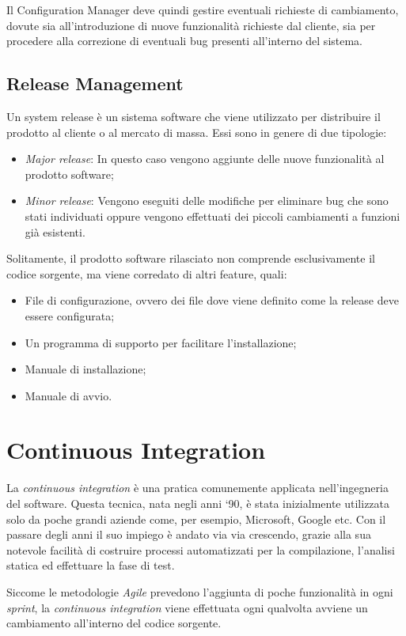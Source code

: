 Il Configuration Manager deve quindi gestire eventuali richieste di
cambiamento, dovute sia all’introduzione di nuove funzionalità richieste dal
cliente, sia per procedere alla correzione di eventuali bug presenti all’interno del
sistema. 

\subsection{Release Management}
Un system release è un sistema software che viene utilizzato per distribuire il
prodotto al cliente o al mercato di massa. Essi sono in genere di due tipologie:
\begin{itemize}
	\item \emph{Major release}: In questo caso vengono aggiunte delle nuove funzionalità al prodotto software;
	\item \emph{Minor release}: Vengono eseguiti delle modifiche per eliminare bug che sono stati individuati oppure vengono effettuati dei piccoli cambiamenti a
	funzioni già esistenti.
\end{itemize}

Solitamente, il prodotto software rilasciato non comprende esclusivamente il
codice sorgente, ma viene corredato di altri feature, quali:
\begin{itemize}
	\item File di configurazione, ovvero dei file dove viene definito come la release
	deve essere configurata;
	\item Un programma di supporto per facilitare l’installazione;
	\item Manuale di installazione;
	\item Manuale di avvio.
\end{itemize}
\section{Continuous Integration}
La \emph{continuous integration} è una pratica comunemente applicata
nell’ingegneria del software. Questa tecnica, nata negli anni ‘90, è stata inizialmente utilizzata solo da poche grandi aziende come, per esempio, Microsoft, Google etc. Con il passare degli anni il suo impiego è andato via via crescendo, grazie alla sua notevole facilità di costruire processi automatizzati per la compilazione, l’analisi statica ed effettuare la fase di test.\cite{zhang2019large}

Siccome le metodologie \emph{Agile} prevedono l’aggiunta di poche funzionalità in ogni \emph{sprint}, la \emph{continuous integration} viene effettuata ogni qualvolta avviene un cambiamento all’interno del codice sorgente.

